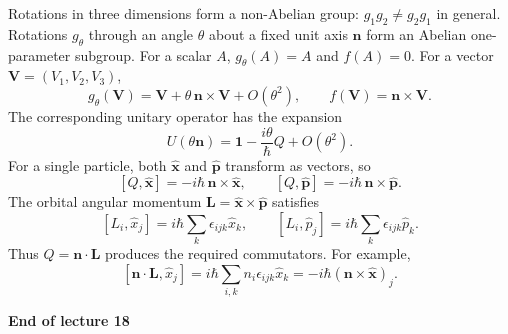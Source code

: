 \documentclass[11pt,a4paper]{article}
\begin{document}
Rotations in three dimensions form a non-Abelian group:
$g_1g_2\ne g_2g_1$ in general. Rotations $g_\theta$ through an angle
$\theta$ about a fixed unit axis $\mathbf n$ form an Abelian
one-parameter subgroup. For a scalar $A$, $g_\theta(A)=A$ and $f(A)=0$.
For a vector $\mathbf V=(V_1,V_2,V_3)$,
\[
    g_\theta(\mathbf V)=\mathbf V+\theta\,\mathbf n\times\mathbf V
        +O(\theta^2),
    \qquad f(\mathbf V)=\mathbf n\times\mathbf V.
\]
The corresponding unitary operator has the expansion
\[
    U(\theta\mathbf n)=\mathbf 1-\frac{i\theta}{\hbar}Q+O(\theta^2).
\]
For a single particle, both $\hat{\mathbf x}$ and $\hat{\mathbf p}$
transform as vectors, so
\[
    [Q,\hat{\mathbf x}]=-i\hbar\,\mathbf n\times\hat{\mathbf x},
    \qquad
    [Q,\hat{\mathbf p}]=-i\hbar\,\mathbf n\times\hat{\mathbf p}.
\]
The orbital angular momentum $\mathbf L=\hat{\mathbf x}\times\hat{\mathbf p}$
satisfies
\[
    [L_i,\hat x_j]=i\hbar\sum_k\epsilon_{ijk}\hat x_k,
    \qquad
    [L_i,\hat p_j]=i\hbar\sum_k\epsilon_{ijk}\hat p_k.
\]
Thus $Q=\mathbf n\cdot\mathbf L$ produces the required commutators.
For example,
\[
    [\mathbf n\cdot\mathbf L,\hat x_j]
        =i\hbar\sum_{i,k}n_i\epsilon_{ijk}\hat x_k
        =-i\hbar(\mathbf n\times\hat{\mathbf x})_j.
\]

\begin{center}
    \textbf{End of lecture 18}
\end{center}
\end{document}
